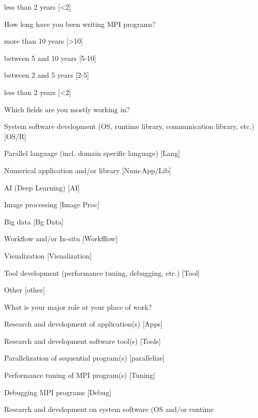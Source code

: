 \documentclass[preprint,5p,times]{elsarticle}
\begin{document}
{\begin{description}
\begin{inparaenum}[{\bf C}1)]
    \item less than 2 years [\textless 2]
    \end{inparaenum}
  \item[Q6:] How long have you been writing MPI programs?
    \begin{inparaenum}[{\bf C}1)]
    \item more than 10 years [\textgreater10]
    \item between 5 and 10 years [5-10]
    \item between 2 and 5 years [2-5]
    \item less than 2 years [\textless 2]
    \end{inparaenum}
  \item[Q7*:] Which fields are you mostly working in?
    \begin{inparaenum}[{\bf C}1)]
    \item System software development (OS, runtime library, communication
      library, etc.) [OS/R]
    \item Parallel language (incl. domain specific language) [Lang]
    \item Numerical application and/or library [Num-App/Lib]
    \item AI (Deep Learning) [AI]
    \item Image processing [Image Proc]
    \item Big data [Bg Data]
    \item Workflow and/or In-situ [Workfflow]
    \item Visualization [Visualization]
    \item Tool development (performance tuning, debugging, etc.) [Tool]
    \item Other [other]
    \end{inparaenum}
  \item[Q8*:] What is your major role at your place of work?
    \begin{inparaenum}[{\bf C}1)]
    \item Research and development of application(s) [Apps]
    \item Research and development software tool(s) [Tools]
    \item Parallelization of sequential program(s) [parallelize]
    \item Performance tuning of MPI program(s) [Tuning]
    \item Debugging MPI programs [Debug]
    \item Research and development on system software (OS and/or runtime

\end{inparaenum}
\end{description}}
\end{document}
